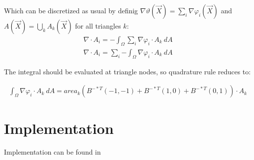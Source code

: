 \documentclass{birkjour}
\numberwithin{equation}{section}
\begin{document}
Which can be discretized as usual by definig $\nabla \vartheta(\vec X) = \sum_i { \nabla \varphi_i(\vec X) }$ and
$A(\vec X) = \bigcup_k { A_k(\vec X) }$ for all triangles $k$:
\begin{eqnarray}
	\nabla \cdot A_i = - \int_{\Omega} { \sum_i { \nabla \varphi_i } \cdot A_k \ dA } \nonumber \\
	\nabla \cdot A_i = \sum_i { - \int_{\Omega} { \nabla \varphi_i \cdot A_k \ dA } } \nonumber
\end{eqnarray}

The integral should be evaluated at triangle nodes, so quadrature rule reduces to:

\begin{eqnarray}
	\int_{\Omega} { \nabla \varphi_i \cdot A_k \ dA } = area_k (B^{-*T} (-1, -1) + B^{-*T} (1, 0) + B^{-*T} (0, 1) ) \cdot A_k  \nonumber
\end{eqnarray}

\section{Implementation}

Implementation can be found in \cite{Basic2DHeatEquationFEM}




\end{document}

